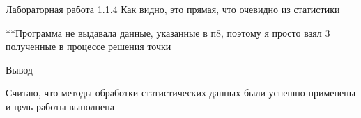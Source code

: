 \documentclass{astroedu-lab}
\begin{document}
\begin{problem}{\large Лабораторная работа 1.1.4}
Как видно, это прямая, что очевидно из статистики


**Программа не выдавала данные, указанные в п8, поэтому я просто взял 3 полученные в процессе решения точки

\begin{bfseries}
	Вывод
\end{bfseries}

Считаю, что методы обработки статистических данных были успешно применены и цель работы выполнена


\end{problem}
\end{document}
